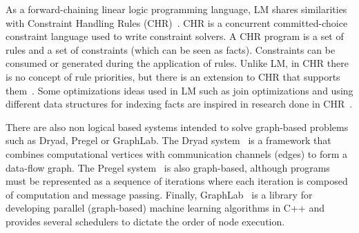 As a forward-chaining linear logic programming language, LM shares similarities with Constraint Handling Rules (CHR)~\cite{Betz:2005kx,Betz:2013:LBA:2422085.2422086,DBLP:journals/corr/abs-1006-3039}.
CHR is a concurrent committed-choice constraint language used to write constraint solvers. A CHR program is a set of rules and
a set of constraints (which can be seen as facts). Constraints can be consumed or generated during the application of rules.
Unlike LM, in CHR there is no
concept of rule priorities, but there is an extension to CHR that supports them~\cite{DeKoninck:2007:URP:1273920.1273924}.
Some optimizations ideas used in LM such as join optimizations and using different data structures for indexing facts
are inspired in research done in CHR~\cite{DBLP:journals/corr/cs-PL-0408025}.

There are also non logical based systems intended to solve graph-based problems such as Dryad, Pregel or GraphLab.
The Dryad system~\cite{Isard:2007:DDD:1272996.1273005} is a framework that combines computational vertices
with communication channels (edges) to form a data-flow graph. 
The Pregel system~\cite{Malewicz:2010:PSL:1807167.1807184} is also graph-based, although programs must be represented
as a sequence of iterations where each iteration is composed of computation and message passing.
Finally, GraphLab~\cite{GraphLab2010} is a library for developing parallel (graph-based) machine learning algorithms in C++
and provides several schedulers to dictate the order of node execution.
